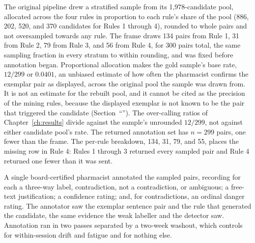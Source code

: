 The original pipeline drew a stratified sample from its 1,978-candidate pool, allocated across the four rules in
proportion to each rule's share of the pool (886, 202, 520, and 370 candidates for Rules 1 through
4), rounded to whole pairs and not oversampled towards any rule. The frame draws 134 pairs from Rule
1, 31 from Rule 2, 79 from Rule 3, and 56 from Rule 4, for 300 pairs total, the same sampling
fraction in every stratum to within rounding, and was fixed before annotation began. Proportional allocation makes the gold sample's base rate, $12/299$ or $0.0401$, an unbiased
estimate of how often the pharmacist confirms the exemplar pair as displayed, across the
original pool the sample was drawn from. It is not an estimate for the rebuilt pool, and it cannot be cited as the precision
of the mining rules, because the displayed exemplar is not known to be
the pair that triggered the candidate (Section~``''). The over-calling ratios
of Chapter~\ref{ch:results} divide against the sample's unrounded $12/299$, not against either
candidate pool's rate. The returned annotation set has $n = 299$ pairs,
one fewer than the frame. The per-rule breakdown, 134, 31, 79, and 55, places the missing row in Rule
4: Rules 1 through 3 returned every sampled pair and Rule 4 returned one fewer than it was sent.

A single board-certified pharmacist annotated the sampled pairs, recording for each a three-way
label, contradiction, not a contradiction, or ambiguous; a free-text justification; a confidence
rating; and, for contradictions, an ordinal danger rating. The annotator saw the exemplar sentence
pair and the rule that generated the candidate, the same evidence the weak labeller and
the detector saw. Annotation ran in two passes separated by a two-week washout, which controls for within-session drift and fatigue and for nothing else.

